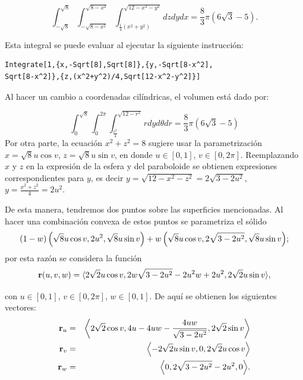 \begin{parrafonumerado}
$$\int _{-\sqrt{8}}^{\sqrt{8}}\int _{-\sqrt{8-x^2}}^{\sqrt{8-x^2}}\int _{\frac{1}{4}
\left(x^2+y^2\right)}^{\sqrt{12-x^2-y^2}}dzdydx= \frac{8}{3}\pi(6\sqrt{3}-5).$$

Esta integral se puede evaluar al ejecutar la siguiente instrucción:

\begin{tcolorbox}[title=\bf Instrucción en \verb"Mathematica", top=2pt,bottom=2pt,boxsep=0pt,before skip=2pt,after skip=0pt]
\begin{Verbatim}[formatcom=\letraverbatim]
Integrate[1,{x,-Sqrt[8],Sqrt[8]},{y,-Sqrt[8-x^2],
Sqrt[8-x^2]},{z,(x^2+y^2)/4,Sqrt[12-x^2-y^2]}]
\end{Verbatim}
\end{tcolorbox}

Al hacer un cambio a coordenadas cilíndricas, el volumen está dado por:

\begin{equation} \label{ejercicio8}
  \int_0^{\sqrt{8}}\int_{0}^{2\pi}\int_{\frac{r^{2}}{4}}^{\sqrt{12-r^{2}}}rdyd\theta dr=\frac{8}{3}\pi\left(6\sqrt{3}-5\right)
\end{equation}
%
Por otra parte, la ecuación $x^{2}+z^{2}=8$ sugiere usar la parametrización $x=\sqrt{8}u\cos v$, $z=\sqrt{8}u\sin v$, en donde $u \in [0,1]$, $v \in [0,2\pi]$. Reemplazando $x$ y $z$ en la expresión de la esfera y del paraboloide se obtienen expresiones correspondientes para $y$,
es decir $y=\sqrt{12-x^{2}-z^{2}}= 2\sqrt{3-2u^{2}}$, $y=\frac{x^{2}+z^{2}}{4}= 2u^{2}$.

De esta manera, tendremos dos puntos sobre las superficies mencionadas. Al hacer una combinación convexa de estos puntos se parametriza el sólido
{\footnotesize
  \[\left( 1-w\right) \left( \sqrt{8}u\cos v,2u^{2},\sqrt{8}u\sin v\right) \linebreak   +w\left( \sqrt{8}u\cos v,2\sqrt{3-2u^{2}},\sqrt{8}u\sin v\right)\!;\]
}
por esta razón se considera la función
%
$$ {\bf r}(u,v,w)= \langle 2\sqrt{2}u\cos v,2w\sqrt{3-2u^{2}}-2u^{2}w+2u^{2},2\sqrt{2}u\sin v \rangle,$$

con $u \in [0,1]$, $v \in [0,2\pi]$, $w \in [0,1]$. De aquí se obtienen los siguientes vectores:
{\small
  \begin{eqnarray*}
    {\bf r}_{u} &=& \left\langle 2\sqrt{2}\cos v,4u-4uw-\frac{4uw}{\sqrt{3-2u^{2}}},2\sqrt{2}\sin v \right\rangle  \\
    {\bf r}_{v} &=& \left\langle  -2\sqrt{2}u\sin v,0,2\sqrt{2}u\cos v\right\rangle  \\
    {\bf r}_{w} &=& \left\langle  0,2\sqrt{3-2u^{2}}-2u^{2},0\right\rangle\!.
  \end{eqnarray*}
}
%


\end{parrafonumerado}
